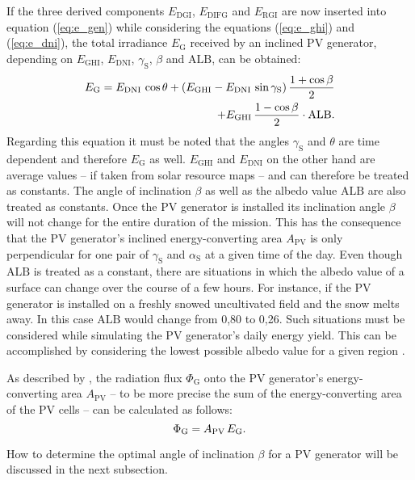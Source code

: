 If the three derived components $E_{\mathrm{DGI}}$, $E_{\mathrm{DIFG}}$ and $E_{\mathrm{RGI}}$ are now inserted into equation (\ref{eq:e_gen}) while considering the equations (\ref{eq:e_ghi}) and (\ref{eq:e_dni}), the total irradiance $E_{\mathrm{G}}$ received by an inclined PV generator, depending on $E_{\mathrm{GHI}}$, $E_{\mathrm{DNI}}$, $\gamma_{\mathrm{S}}$, $\beta$ and $\mathrm{ALB}$, can be obtained:
	\begin{equation} \label{eq:e_gen_ghi_dni}
	\centering
		\begin{split}
		E_{\mathrm{G}} = E_{\mathrm{DNI}} \, \cos \theta + \left(E_{\mathrm{GHI}} - E_{\mathrm{DNI}} \, \sin \gamma_{\mathrm{S}}\right) \frac{1 + \cos \beta }{2} \\ 
		+ E_{\mathrm{GHI}} \, \frac{1 - \cos \beta }{2} \cdot \mathrm{ALB} \text{.}
		\end{split}
	\end{equation}
Regarding this equation it must be noted that the angles $\gamma_{\mathrm{S}}$ and $\theta$ are time dependent and therefore $E_{\mathrm{G}}$ as well. $E_{\mathrm{GHI}}$ and $E_{\mathrm{DNI}}$ on the other hand are average values -- if taken from solar resource maps -- and can therefore be treated as constants. The angle of inclination $\beta$ as well as the albedo value $\mathrm{ALB}$ are also treated as constants. Once the PV generator is installed its inclination angle $\beta$ will not change for the entire duration of the mission. This has the consequence that the PV generator's inclined energy-converting area $A_{\mathrm{PV}}$ is only perpendicular for one pair of $\gamma_{\mathrm{S}}$ and $\alpha_{\mathrm{S}}$ at a given time of the day. Even though $\mathrm{ALB}$ is treated as a constant, there are situations in which the albedo value of a surface can change over the course of a few hours. For instance, if the PV generator is installed on a freshly snowed uncultivated field and the snow melts away. In this case $\mathrm{ALB}$ would change from 0,80 to 0,26. Such situations must be considered while simulating the PV generator's daily energy yield. This can be accomplished by considering the lowest possible albedo value for a given region \cite{Appelbaum:1992, Landis:1995, Mertens:2015}.

As described by \cite{Mertens:2015, Wagner:2018}, the radiation flux $\Phi_{\mathrm{G}}$ onto the PV generator's energy-converting area $A_{\mathrm{PV}}$ -- to be more precise the sum of the energy-converting area of the PV cells -- can be calculated as follows:
	\begin{equation} \label{eq:radiation_flux}
	\centering
		\Phi_{\mathrm{G}} = A_{\mathrm{PV}} \, E_{\mathrm{G}}\text{.} 
	\end{equation}

How to determine the optimal angle of inclination $\beta$ for a PV generator will be discussed in the next subsection.
